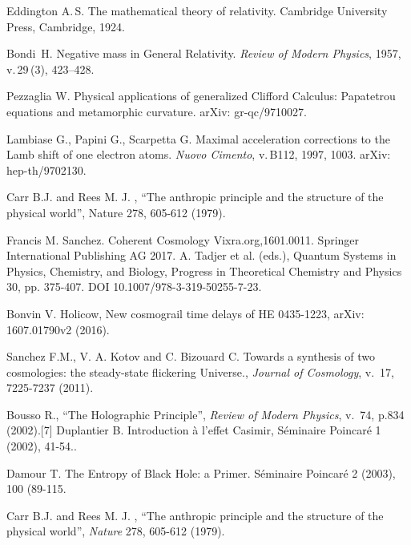 \documentclass[twoside,draft]{article}
\begin{document}
{\begin{thebibliography}{99}\footnotesize

 Eddington A.\,S. The mathematical
theory of relativity. Cambridge University Press,
Cambridge, 1924. %

  Bondi~H. Negative mass in General 
Relativity. \textit{Review of Modern Physics}, 1957, 
v.\,29\,(3), 423--428. %

 Pezzaglia W. Physical applications of 
generalized Clifford Calculus: Papatetrou equations 
and metamorphic curvature. arXiv: gr-qc/9710027. 

  Lambiase G., Papini G.,  Scarpetta G. 
Maximal acceleration corrections to the Lamb shift
of one electron atoms. \textit{Nuovo Cimento}, 
v.\,B112, 1997, 1003. arXiv: hep-th/9702130.

 Carr B.J. and Rees M. J. , “The anthropic principle and the structure of the physical world”,
Nature 278, 605-612 (1979). %

 Francis M. Sanchez. Coherent Cosmology Vixra.org,1601.0011. Springer International Publishing AG
2017. A. Tadjer et al. (eds.), Quantum Systems in Physics, Chemistry, and Biology, Progress in
Theoretical Chemistry and Physics 30, pp. 375-407. DOI 10.1007/978-3-319-50255-7-23. %

 Bonvin V. Holicow, New cosmograil time delays of HE 0435-1223, arXiv: 1607.01790v2
(2016). %

 Sanchez F.M., V. A. Kotov and C. Bizouard C. Towards a synthesis of two cosmologies: the
steady-state flickering Universe., \textit{Journal of Cosmology}, v.\, 17, 7225-7237 (2011). %

 Bousso R., “The Holographic Principle”, \textit{Review of Modern Physics}, v.\, 74, p.834 (2002).[7] Duplantier B. Introduction à l'effet Casimir, Séminaire Poincaré 1 (2002), 41-54.. %

 Damour T. The Entropy of Black Hole: a Primer. Séminaire Poincaré 2 (2003), 100 (89-115. %

 Carr B.J. and Rees M. J. , “The anthropic principle and the structure of the physical world”,
\textit{Nature} 278, 605-612 (1979). %


\end{thebibliography}}
\end{document}
